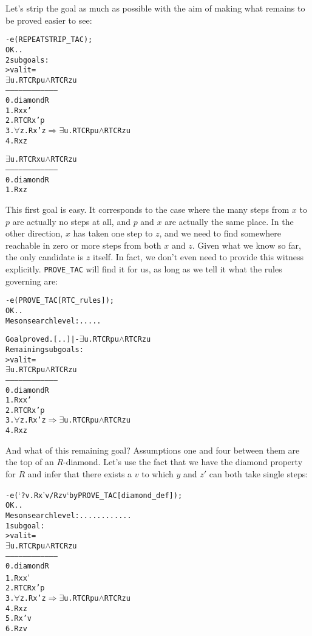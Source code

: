 Let's strip the goal as much as possible with the aim of making what
remains to be proved easier to see:
\begin{session}
\begin{alltt}
- e (REPEAT STRIP_TAC);
OK..
2 subgoals:
> val it =
    \(\exists\)u. RTC R p u \(\land\) RTC R z u
    ------------------------------------
      0.  diamond R
      1.  R x x'
      2.  RTC R x' p
      3.  \(\forall\)z. R x' z \(\Rightarrow\) \(\exists\)u. RTC R p u \(\land\) RTC R z u
      4.  R x z

    \(\exists\)u. RTC R x u \(\land\) RTC R z u
    ------------------------------------
      0.  diamond R
      1.  R x z
\end{alltt}
\end{session}
This first goal is easy.  It corresponds to the case where the many
steps from $x$ to $p$ are actually no steps at all, and $p$ and $x$
are actually the same place.  In the other direction, $x$ has taken
one step to $z$, and we need to find somewhere reachable in zero or
more steps from both $x$ and $z$.  Given what we know so far, the only
candidate is $z$ itself.  In fact, we don't even need to provide this
witness explicitly. \texttt{PROVE\_TAC} will find it for us, as long
as we tell it what the rules governing  are:
\begin{session}
\begin{alltt}
- e (PROVE_TAC [RTC_rules]);
OK..
Meson search level: .....

Goal proved. [..] |- \(\exists\)u. RTC R p u \(\land\) RTC R z u
Remaining subgoals:
> val it =
    \(\exists\)u. RTC R p u \(\land\) RTC R z u
    ------------------------------------
      0.  diamond R
      1.  R x x'
      2.  RTC R x' p
      3.  \(\forall\)z. R x' z \(\Rightarrow\) \(\exists\)u. RTC R p u \(\land\) RTC R z u
      4.  R x z
\end{alltt}
\end{session}
    And what of this remaining goal?  Assumptions one and four
    between them are the top of an $R$-diamond.  Let's use the fact
    that we have the diamond property for $R$ and infer that there
    exists a $v$ to which $y$ and $z'$ can both take single steps:
\begin{session}
\begin{alltt}
- e (`?v. R x' v /\bs R z v` by PROVE_TAC [diamond_def]);
OK..
Meson search level: ............
1 subgoal:
> val it =
    \(\exists\)u. RTC R p u \(\land\) RTC R z u
    ------------------------------------
      0.  diamond R
      1.  R x x'
      2.  RTC R x' p
      3.  \(\forall\)z. R x' z \(\Rightarrow\) \(\exists\)u. RTC R p u \(\land\) RTC R z u
      4.  R x z
      5.  R x' v
      6.  R z v
\end{alltt}
\end{session}
